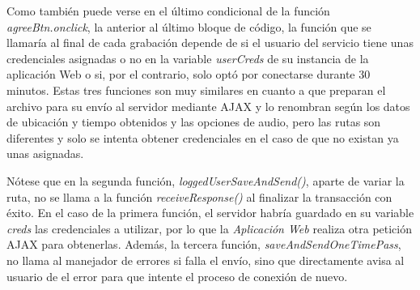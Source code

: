 
Como también puede verse en el último condicional de la función \emph{agreeBtn.onclick}, la anterior al último bloque de código, la función que se llamaría al final de cada grabación depende de si el usuario del servicio tiene unas credenciales asignadas o no en la variable \emph{userCreds} de su instancia de la aplicación Web o si, por el contrario, solo optó por conectarse durante 30 minutos. Estas tres funciones son muy similares en cuanto a que preparan el archivo para su envío al servidor mediante AJAX y lo renombran según los datos de ubicación y tiempo obtenidos y las opciones de audio, pero las rutas son diferentes y solo se intenta obtener credenciales en el caso de que no existan ya unas asignadas.

Nótese que en la segunda función, \emph{loggedUserSaveAndSend()}, aparte de variar la ruta, no se llama a la función \emph{receiveResponse()} al finalizar la transacción con éxito. En el caso de la primera función, el servidor habría guardado en su variable \emph{creds} las credenciales a utilizar, por lo que la \emph{Aplicación Web} realiza otra petición AJAX para obtenerlas. Además, la tercera función, \emph{saveAndSendOneTimePass}, no llama al manejador de errores si falla el envío, sino que directamente avisa al usuario de el error para que intente el proceso de conexión de nuevo.

